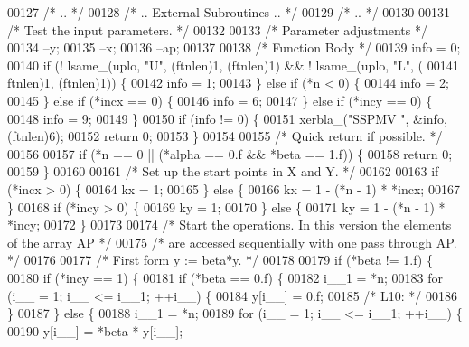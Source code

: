 \begin{DoxyCode}
00127 \textcolor{comment}{/*     .. */}
00128 \textcolor{comment}{/*     .. External Subroutines .. */}
00129 \textcolor{comment}{/*     .. */}
00130 
00131 \textcolor{comment}{/*     Test the input parameters. */}
00132 
00133     \textcolor{comment}{/* Parameter adjustments */}
00134     --y;
00135     --x;
00136     --ap;
00137 
00138     \textcolor{comment}{/* Function Body */}
00139     info = 0;
00140     \textcolor{keywordflow}{if} (! lsame\_(uplo, \textcolor{stringliteral}{"U"}, (ftnlen)1, (ftnlen)1) && ! lsame\_(uplo, \textcolor{stringliteral}{"L"}, (
00141         ftnlen)1, (ftnlen)1)) \{
00142     info = 1;
00143     \} \textcolor{keywordflow}{else} \textcolor{keywordflow}{if} (*n < 0) \{
00144     info = 2;
00145     \} \textcolor{keywordflow}{else} \textcolor{keywordflow}{if} (*incx == 0) \{
00146     info = 6;
00147     \} \textcolor{keywordflow}{else} \textcolor{keywordflow}{if} (*incy == 0) \{
00148     info = 9;
00149     \}
00150     \textcolor{keywordflow}{if} (info != 0) \{
00151     xerbla\_(\textcolor{stringliteral}{"SSPMV "}, &info, (ftnlen)6);
00152     \textcolor{keywordflow}{return} 0;
00153     \}
00154 
00155 \textcolor{comment}{/*     Quick return if possible. */}
00156 
00157     \textcolor{keywordflow}{if} (*n == 0 || (*alpha == 0.f && *beta == 1.f)) \{
00158     \textcolor{keywordflow}{return} 0;
00159     \}
00160 
00161 \textcolor{comment}{/*     Set up the start points in  X  and  Y. */}
00162 
00163     \textcolor{keywordflow}{if} (*incx > 0) \{
00164     kx = 1;
00165     \} \textcolor{keywordflow}{else} \{
00166     kx = 1 - (*n - 1) * *incx;
00167     \}
00168     \textcolor{keywordflow}{if} (*incy > 0) \{
00169     ky = 1;
00170     \} \textcolor{keywordflow}{else} \{
00171     ky = 1 - (*n - 1) * *incy;
00172     \}
00173 
00174 \textcolor{comment}{/*     Start the operations. In this version the elements of the array AP */}
00175 \textcolor{comment}{/*     are accessed sequentially with one pass through AP. */}
00176 
00177 \textcolor{comment}{/*     First form  y := beta*y. */}
00178 
00179     \textcolor{keywordflow}{if} (*beta != 1.f) \{
00180     \textcolor{keywordflow}{if} (*incy == 1) \{
00181         \textcolor{keywordflow}{if} (*beta == 0.f) \{
00182         i\_\_1 = *n;
00183         \textcolor{keywordflow}{for} (i\_\_ = 1; i\_\_ <= i\_\_1; ++i\_\_) \{
00184             y[i\_\_] = 0.f;
00185 \textcolor{comment}{/* L10: */}
00186         \}
00187         \} \textcolor{keywordflow}{else} \{
00188         i\_\_1 = *n;
00189         \textcolor{keywordflow}{for} (i\_\_ = 1; i\_\_ <= i\_\_1; ++i\_\_) \{
00190             y[i\_\_] = *beta * y[i\_\_];

\end{DoxyCode}
